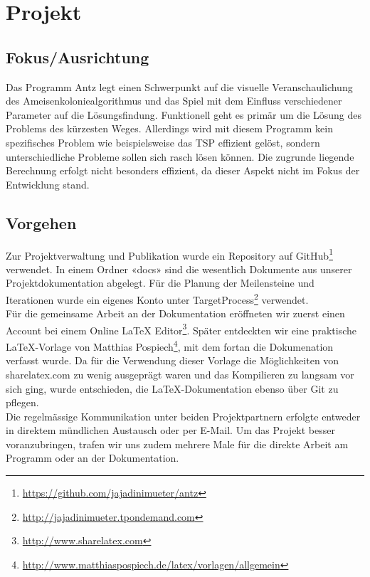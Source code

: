 
\chapter{Projekt}



\section{Fokus/Ausrichtung}

Das Programm Antz legt einen Schwerpunkt auf die visuelle Veranschaulichung des Ameisenkoloniealgorithmus und das Spiel mit dem Einfluss verschiedener Parameter auf die Lösungsfindung. Funktionell geht es primär um die Lösung des Problems des kürzesten Weges. Allerdings wird mit diesem Programm kein spezifisches Problem wie beispielsweise das TSP effizient gelöst, sondern unterschiedliche Probleme sollen sich rasch lösen können. Die zugrunde liegende Berechnung erfolgt nicht besonders effizient, da dieser Aspekt nicht im Fokus der Entwicklung stand.



\vspace*{1cm}



\section{Vorgehen}

Zur Projektverwaltung und Publikation wurde ein Repository auf GitHub\footnote{\url{https://github.com/jajadinimueter/antz}} verwendet. In einem Ordner «docs» sind die wesentlich Dokumente aus unserer Projektdokumentation abgelegt. Für die Planung der Meilensteine und Iterationen wurde ein eigenes Konto unter TargetProcess\footnote{\url{http://jajadinimueter.tpondemand.com}} verwendet. \\
Für die gemeinsame Arbeit an der Dokumentation eröffneten wir zuerst einen Account bei einem Online LaTeX Editor\footnote{\url{http://www.sharelatex.com}}. Später entdeckten wir eine praktische LaTeX-Vorlage von Matthias Pospiech\footnote{\url{http://www.matthiaspospiech.de/latex/vorlagen/allgemein}}, mit dem fortan die Dokumenation verfasst wurde. Da für die Verwendung dieser Vorlage die Möglichkeiten von sharelatex.com zu wenig ausgeprägt waren und das Kompilieren zu langsam vor sich ging, wurde entschieden, die LaTeX-Dokumentation ebenso über Git zu pflegen. \\
Die regelmässige Kommunikation unter beiden Projektpartnern erfolgte entweder in direktem mündlichen Austausch oder per E-Mail. Um das Projekt besser voranzubringen, trafen wir uns zudem mehrere Male für die direkte Arbeit am Programm oder an der Dokumentation. \\



